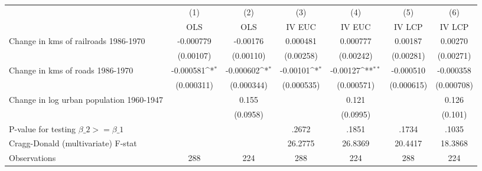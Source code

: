 {
\def\sym#1{\ifmmode^{#1}\else\(^{#1}\)\fi}
\begin{tabular}{l*{6}{c}}
\hline\hline
                &\multicolumn{1}{c}{(1)}&\multicolumn{1}{c}{(2)}&\multicolumn{1}{c}{(3)}&\multicolumn{1}{c}{(4)}&\multicolumn{1}{c}{(5)}&\multicolumn{1}{c}{(6)}\\
                &\multicolumn{1}{c}{OLS}&\multicolumn{1}{c}{OLS}&\multicolumn{1}{c}{IV EUC}&\multicolumn{1}{c}{IV EUC}&\multicolumn{1}{c}{IV LCP}&\multicolumn{1}{c}{IV LCP}\\
\hline
Change in kms of railroads 1986-1970&-0.000779         & -0.00176         & 0.000481         & 0.000777         &  0.00187         &  0.00270         \\
                &(0.00107)         &(0.00110)         &(0.00258)         &(0.00242)         &(0.00281)         &(0.00271)         \\
[1em]
Change in kms of roads 1986-1970&-0.000581\sym{*}  &-0.000602\sym{*}  & -0.00101\sym{*}  & -0.00127\sym{**} &-0.000510         &-0.000358         \\
                &(0.000311)         &(0.000344)         &(0.000535)         &(0.000571)         &(0.000615)         &(0.000708)         \\
[1em]
Change in log urban population 1960-1947&                  &    0.155         &                  &    0.121         &                  &    0.126         \\
                &                  & (0.0958)         &                  & (0.0995)         &                  &  (0.101)         \\
\hline
P-value for testing $\beta\_{2} >= \beta\_{1}$&                  &                  &    .2672         &    .1851         &    .1734         &    .1035         \\
Cragg-Donald (multivariate) F-stat&                  &                  &  26.2775         &  26.8369         &  20.4417         &  18.3868         \\
Observations    &      288         &      224         &      288         &      224         &      288         &      224         \\
\hline\hline
\end{tabular}
}
